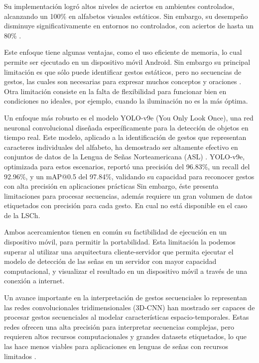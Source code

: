 \documentclass[10pt]{article}
\begin{document}
\vspace{1\baselineskip}
Su implementación logró altos niveles de aciertos en ambientes controlados, alcanzando un 100$\%$ en alfabetos visuales estáticos. Sin embargo, su desempeño disminuye significativamente en entornos no controlados, con aciertos de hasta un 80$\%$ .

\vspace{1\baselineskip}
Este enfoque tiene algunas ventajas, como el uso eficiente de memoria, lo cual permite ser ejecutado en un dispositivo móvil Android. Sin embargo su principal limitación es que sólo puede identificar gestos estáticos, pero no secuencias de gestos, las cuales son necesarias para expresar muchos conceptos y oraciones . Otra limitación consiste en la falta de flexibilidad para funcionar bien en condiciones no ideales, por ejemplo, cuando la iluminación no es la más óptima.

\vspace{1\baselineskip}
Un enfoque más robusto es el modelo YOLO-v9e (You Only Look Once), una red neuronal convolucional diseñada específicamente para la detección de objetos en tiempo real. Este modelo, aplicado a la identificación de gestos que representan caracteres individuales del alfabeto, ha demostrado ser altamente efectivo  en conjuntos de datos de la Lengua de Señas Norteamericana (ASL) . YOLO-v9e, optimizada para estos escenarios, reportó una precisión del 96.83$\%$, un recall del 92.96$\%$, y un mAP@0.5 del 97.84$\%$, validando su capacidad para reconocer gestos con alta precisión en aplicaciones prácticas  Sin embargo, éste presenta limitaciones para procesar secuencias, además requiere un gran volumen de datos etiquetados con precisión para cada gesto. En cual no está disponible en el caso de la LSCh. 

\vspace{1\baselineskip}
Ambos acercamientos tienen en común su factibilidad de ejecución en un dispositivo móvil, para permitir la portabilidad. Esta limitación la podemos superar al utilizar una arquitectura cliente-servidor que permita ejecutar el modelo de detección de las señas en un servidor con mayor capacidad computacional, y visualizar el resultado en un dispositivo móvil a través de una conexión a internet.

\vspace{1\baselineskip}
Un avance importante en la interpretación de gestos secuenciales lo representan las redes convolucionales tridimensionales (3D-CNN) han mostrado ser capaces de procesar gestos secuenciales al modelar características espacio-temporales. Estas redes ofrecen una alta precisión para interpretar secuencias complejas, pero requieren altos recursos computacionales y grandes datasets etiquetados, lo que las hace menos viables para aplicaciones en lenguas de señas con recursos limitados .
\end{document}
